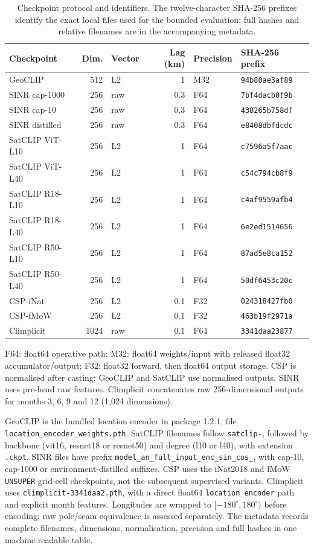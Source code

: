 \begin{table}[htbp]\centering\small
\caption{Checkpoint protocol and identifiers. The twelve-character SHA-256 prefixes identify the exact local files used for the bounded evaluation; full hashes and relative filenames are in the accompanying metadata.}
\label{tab:checkpoints}
\begin{tabular}{@{}lrlrll@{}}\toprule
Checkpoint&Dim.&Vector&Lag (km)&Precision&SHA-256 prefix\\\midrule
GeoCLIP&512&L2&1&M32&\texttt{94b80ae3af89}\\
SINR cap-1000&256&raw&0.3&F64&\texttt{7bf4dacb0f9b}\\
SINR cap-10&256&raw&0.3&F64&\texttt{438265b758df}\\
SINR distilled&256&raw&0.3&F64&\texttt{e8408dbfdcdc}\\
SatCLIP ViT-L10&256&L2&1&F64&\texttt{c7596a5f7aac}\\
SatCLIP ViT-L40&256&L2&1&F64&\texttt{c54c794cb8f9}\\
SatCLIP R18-L10&256&L2&1&F64&\texttt{c4af9559afb4}\\
SatCLIP R18-L40&256&L2&1&F64&\texttt{6e2ed1514656}\\
SatCLIP R50-L10&256&L2&1&F64&\texttt{87ad5e8ca152}\\
SatCLIP R50-L40&256&L2&1&F64&\texttt{50df6453c20c}\\
CSP-iNat&256&L2&0.1&F32&\texttt{024318427fb0}\\
CSP-fMoW&256&L2&0.1&F32&\texttt{463b19f2971a}\\
Climplicit&1024&raw&0.1&F64&\texttt{3341daa23877}\\
\bottomrule\end{tabular}
\par\smallskip\parbox{.97\textwidth}{\footnotesize F64: float64 operative path; M32: float64 weights/input with released float32 accumulator/output; F32: float32 forward, then float64 output storage. CSP is normalised after casting; GeoCLIP and SatCLIP use normalised outputs. SINR uses pre-head raw features. Climplicit concatenates raw 256-dimensional outputs for months 3, 6, 9 and 12 (1,024 dimensions).}
\end{table}
GeoCLIP is the bundled location encoder in package 1.2.1, file \texttt{location\_encoder\_weights.pth}. SatCLIP filenames follow \texttt{satclip-}, followed by backbone (vit16, resnet18 or resnet50) and degree (l10 or l40), with extension \texttt{.ckpt}. SINR files have prefix \texttt{model\_an\_full\_}\allowbreak\texttt{input\_enc\_}\allowbreak\texttt{sin\_cos\_}, with cap-10, cap-1000 or environment-distilled suffixes. CSP uses the iNat2018 and fMoW \texttt{UNSUPER} grid-cell checkpoints, not the subsequent supervised variants. Climplicit uses \texttt{climplicit-3341daa2.pth}, with a direct float64 \texttt{location\_encoder} path and explicit month features. Longitudes are wrapped to $[-180^\circ,180^\circ)$ before encoding; raw pole/seam equivalence is assessed separately. The metadata records complete filenames, dimensions, normalisation, precision and full hashes in one machine-readable table.
